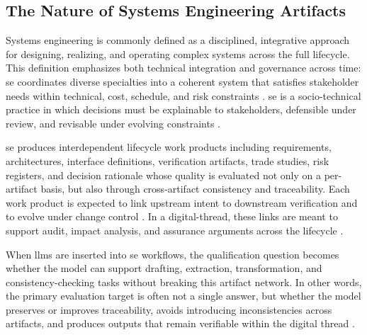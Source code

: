 \subsection{The Nature of Systems Engineering Artifacts}
\label{subsec:ch2_se_artifacts}

Systems engineering is commonly defined as a disciplined, integrative approach for designing, realizing, and operating complex systems across the full lifecycle. This definition emphasizes both technical integration and governance across time: \ac{se} coordinates diverse specialties into a coherent system that satisfies stakeholder needs within technical, cost, schedule, and risk constraints
\cite{incose_GuideSystemsEngineering_2025, maier_ArtSystemsArchitecting_2002, walden_systems_engineering_handbook_2015}. \ac{se} is a socio-technical practice in which decisions must be explainable to stakeholders, defensible under review, and revisable under evolving constraints \cite{BuedeMiller_EngineeringDesignOfSystems_2016, grady_SystemSynthesisProduct_2010, Blanchard_Fabrycky_Systems_Engineering_and_Analysis_2011, blanchard_system_engineering_management_2008 , Langford_engineering_systems_integration_2012}.

\ac{se} produces interdependent lifecycle work products including requirements, architectures, interface definitions, verification artifacts, trade studies, risk registers, and decision rationale whose quality is evaluated not only on a per-artifact basis, but also through cross-artifact consistency and traceability. Each work product is expected to link upstream intent to downstream verification and to evolve under change control \cite{standard_ieee_15288_2023, walden_systems_engineering_handbook_2015}. In a digital-thread, these links are meant to support audit, impact analysis, and assurance arguments across the lifecycle \cite{deputyassistantsecretaryofdefense_DepartmentDefenseDigitalStrategy_2018, Ouzzif_Leveraging_AI_Manage_Technical_Debt_Test_Evaluation_2025, Helmerich_Transforming_Systems_Engineering_Agentic_AI_2025}.


When \acp{llm} are inserted into \ac{se} workflows, the qualification question becomes whether the model can support drafting, extraction, transformation, and consistency-checking tasks without breaking this artifact network. In other words, the primary evaluation target is often not a single answer, but whether the model preserves or improves traceability, avoids introducing inconsistencies across artifacts, and produces outputs that remain verifiable within the digital thread \cite{NIST_ArtificialIntelligenceRisk_2023,  Traveller_Agile_Engineering_Agentic_Co_Modelers_2025, Ouzzif_Leveraging_AI_Manage_Technical_Debt_Test_Evaluation_2025}. 




